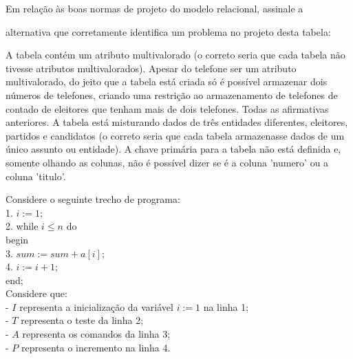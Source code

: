 \documentclass[12pt, addpoints]{exam}
\begin{document}
\begin{questions}
Em relação às boas normas de projeto do modelo relacional, assinale a

alternativa que corretamente identifica um problema no projeto desta tabela:
\begin{choices}
\choice A tabela contém um atributo multivalorado (o correto seria que cada tabela não tivesse atributos multivalorados).
\choice Apesar do telefone ser um atributo multivalorado, do jeito que a tabela está criada só é possível armazenar dois números de telefones, criando uma restrição ao armazenamento de telefones de contado de eleitores que tenham mais de dois telefones.
\choice Todas as afirmativas anteriores.
\choice A tabela está misturando dados de três entidades diferentes, eleitores, partidos e candidatos (o correto seria que cada tabela armazenasse dados de um único assunto ou entidade).
\choice A chave primária para a tabela não está definida e, somente olhando as colunas, não é possível dizer se é a coluna 'numero' ou a coluna 'titulo'.
\end{choices}

\question

Considere o seguinte trecho de programa:\\

1. \( i := 1; \)\\

2. while \( i \leq n \) do\\

   begin\\

3. \( sum := sum + a[i]; \)\\

4. \( i := i + 1; \)\\

   end;\\



Considere que:\\

- \( I \) representa a inicialização da variável \( i := 1 \) na linha 1;\\

- \( T \) representa o teste da linha 2;\\

- \( A \) representa os comandos da linha 3;\\

- \( P \) representa o incremento na linha 4.\\




\end{questions}
\end{document}
